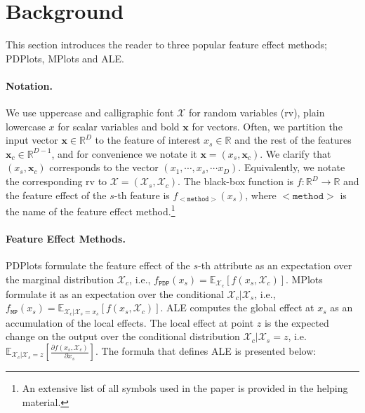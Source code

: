 \documentclass[wcp]{jmlr}
\newcommand{\xc}{\mathbf{x}_c}
\newcommand{\Xcb}{\mathcal{X}_c}
\newcommand{\xb}{\mathbf{x}}
\newcommand{\R}{\mathbb{R}}
\newcommand{\E}{\mathbb{E}}
\begin{document}
\section{Background}
\label{sec:3-feature-effect}

This section introduces the reader to three popular feature effect
methods; PDPlots, MPlots and ALE.

\paragraph*{Notation.} We use uppercase and calligraphic font
\( \mathcal{X}\) for random variables (rv), plain lowercase \( x \)
for scalar variables and bold \( \xb \) for vectors. Often, we
partition the input vector \(\xb \in \R^D\) to the feature of interest
\(x_s \in \R \) and the rest of the features \(\xc \in \R^{D-1}\), and
for convenience we notate it \(\xb = (x_s, \xc)\). We clarify that
\((x_s, \xc)\) corresponds to the vector
\((x_1, \cdots, x_s, \cdots x_D)\). Equivalently, we notate the
corresponding rv to \(\mathcal{X} = (\mathcal{X}_s,
\mathcal{X}_c)\). The black-box function is
\( f: \R^D \rightarrow \R \) and the feature effect of the \(s\)-th
feature is \(f_{\mathtt{<method>}}(x_s)\), where \(\mathtt{<method>}\)
is the name of the feature effect method.\footnote{An extensive list
  of all symbols used in the paper is provided in the helping
  material.}

\paragraph{Feature Effect Methods.} PDPlots formulate the feature
effect of the \(s\)-th attribute as an expectation over the marginal
distribution \(\mathcal{X}_c\), i.e.,
\(f_{\mathtt{PDP}}(x_s) =
\mathbb{\E}_{\mathcal{X}_c}[f(x_s,\mathcal{X}_c)]\). MPlots formulate
it as an expectation over the conditional
\(\mathcal{X}_c|\mathcal{X}_s\), i.e.,
\(f_{\mathtt{MP}}(x_s) = \E_{\mathcal{X}_c|\mathcal{X}_s = x_s}[f(x_s,
\mathcal{X}_c)]\). ALE computes the global effect at \(x_s\) as an
accumulation of the local effects. The local effect at point \(z\) is
the expected change on the output over the conditional distribution
\(\Xcb|\mathcal{X}_s=z\), i.e.
\( \E_{\Xcb|\mathcal{X}_s=z} \left [ \frac{\partial f(x_s,
    \mathcal{X}_c)}{\partial x_s} \right] \). The formula that defines
ALE is presented below:
\end{document}
